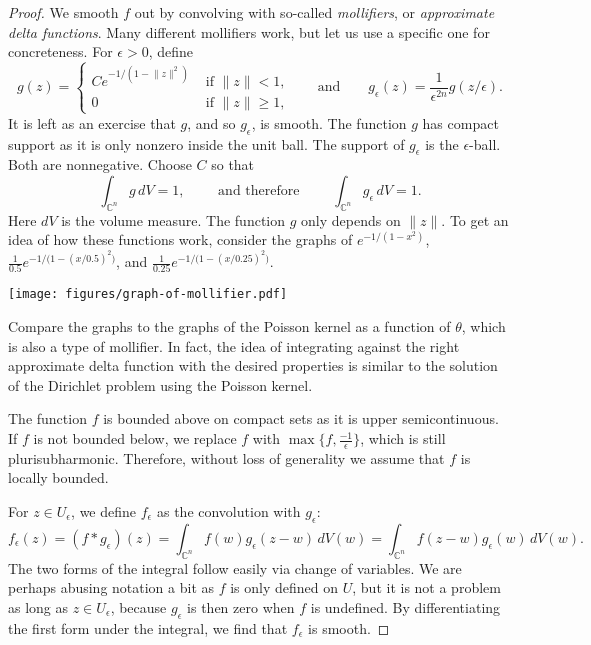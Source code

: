 \documentclass[12pt,openany]{book}
\newcommand{\snorm}[1]{\lVert {#1} \rVert}
\newcommand{\C}{{\mathbb{C}}}
\theoremstyle{plain}
\theoremstyle{remark}
\theoremstyle{definition}
\newenvironment{myfig}{%
    \begin{center}
}{%
    \end{center}
}
\theoremstyle{exercise}
\theoremstyle{example}
\begin{document}
\begin{proof}
We smooth $f$ out by convolving with so-called
\emph{mollifiers}, or
\emph{approximate delta functions}.
Many different mollifiers 
work, but let us use a specific one for concreteness.
For $\epsilon > 0$, define 
\begin{equation*}
g(z) = 
\begin{cases}
C e^{-1/(1-\snorm{z}^2)} & \text{ if $\snorm{z} < 1$,}
\\
0 & \text{ if $\snorm{z} \geq 1$,}
\end{cases}
\qquad
\text{and}
\qquad
g_\epsilon(z) = \frac{1}{\epsilon^{2n}} g(z/\epsilon) .
\end{equation*}
It is left as an exercise that $g$, and so $g_\epsilon$, is smooth.
The function $g$ has compact
support as it is only nonzero inside the unit ball.  The support of
$g_\epsilon$ is the $\epsilon$-ball.  Both are nonnegative.  Choose $C$ so that
\begin{equation*}
\int_{\C^n} g\, dV = 1 ,
\qquad \text{ and therefore } \qquad
\int_{\C^n} g_\epsilon\, dV = 1 .
\end{equation*}
%
Here $dV$ is the volume measure.
The function $g$ only depends on $\snorm{z}$.
To get an idea of
how these functions work, consider the graphs of
$e^{-1/(1-x^2)}$,
$\frac{1}{0.5}e^{-1/\bigl(1-{(x/0.5)}^2\bigr)}$, and
$\frac{1}{0.25}e^{-1/\bigl(1-{(x/0.25)}^2\bigr)}$.

\begin{myfig}
\texttt{[image: figures/graph-of-mollifier.pdf]}
\end{myfig}

Compare the graphs to the graphs of the Poisson kernel as a function of
$\theta$, which is also a type of mollifier.  In fact, the idea of
integrating against the right approximate delta function with the desired properties
is similar to the solution of the Dirichlet
problem using the Poisson kernel.

The function $f$ is bounded above on compact sets as it is upper semicontinuous.
If $f$ is not bounded below, we replace $f$ with $\max \bigl\{ f ,
\frac{-1}{\epsilon}
\bigr\}$, which is still plurisubharmonic.  Therefore, without loss of generality
we assume that $f$ is locally bounded.

For $z \in U_\epsilon$, we define $f_\epsilon$ as
the convolution with $g_\epsilon$:
%
\begin{equation*}
f_\epsilon(z) = (f * g_\epsilon)(z) =
\int_{\C^n} f(w) g_\epsilon (z-w) \, dV(w) =
\int_{\C^n} f(z-w) g_\epsilon (w) \, dV(w) .
\end{equation*}
The two forms of the integral follow easily via change of variables.
We are perhaps abusing notation a bit as $f$ is only defined on $U$,
but it is not a problem as long as $z \in
U_\epsilon$, because $g_\epsilon$ is then zero when $f$ is undefined.
By differentiating the first form under the integral, we find that
$f_\epsilon$ is smooth.


\end{proof}
\end{document}
